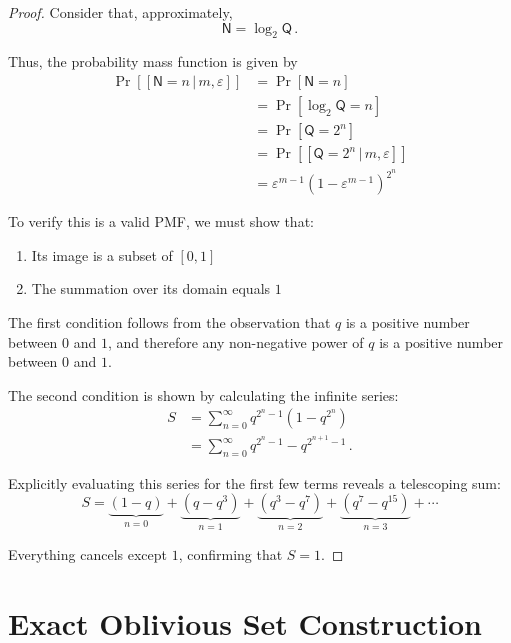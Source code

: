 \documentclass[11pt,a4paper]{article}
\newcommand{\RV}[1]{\mathsf{#1}}           %
\newcommand{\PDF}[2][]{\Pr\left[#2\right]} %
\newcommand{\Prob}[1]{\Pr\left[#1\right]}  %
\newcommand{\fprate}{\varepsilon}          %
\newcommand{\Given}{\,|\,}
\begin{document}
\begin{proof}
Consider that, approximately,
\begin{equation}
    \RV{N} = \log_2 \RV{Q}\,.
\end{equation}

Thus, the probability mass function is given by
\begin{align}
    \PDF{[\RV{N} = n \Given m,\fprate]}
        &= \Prob{\RV{N} = n}\\
        &= \Prob{\log_2 \RV{Q} = n}\\
        &= \Prob{\RV{Q} = 2^n}\\
        &= \PDF{[\RV{Q} = 2^n \Given m, \fprate]}\\
        &= \fprate^{m-1} (1 - \fprate^{m-1})^{2^n}
\end{align}

To verify this is a valid PMF, we must show that:
\begin{enumerate}
    \item Its image is a subset of $[0,1]$
    \item The summation over its domain equals $1$
\end{enumerate}

The first condition follows from the observation that $q$ is a positive number between $0$ and $1$, and therefore any non-negative power of $q$ is a positive number between $0$ and $1$.

The second condition is shown by calculating the infinite series:
\begin{align}
S &= \sum_{n=0}^{\infty} q^{2^n-1}\left(1-q^{2^n}\right)\\
&= \sum_{n=0}^{\infty} q^{2^n-1} - q^{2^{n+1}-1}\,.
\end{align}

Explicitly evaluating this series for the first few terms reveals a telescoping sum:
\begin{equation}
S = \underbrace{(1 - q)}_{n=0} + \underbrace{(q - q^3)}_{n=1} + \underbrace{(q^3 - q^7)}_{n=2} + \underbrace{(q^7 - q^{15})}_{n=3} + \cdots
\end{equation}

Everything cancels except $1$, confirming that $S = 1$.
\end{proof}

\section{Exact Oblivious Set Construction}
\end{document}
